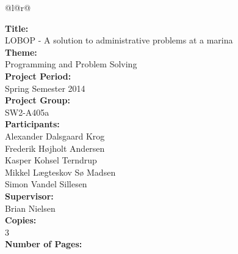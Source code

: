 \pagestyle{titlepagestyleeng}


\begin{nopagebreak}
{\begin{center}
    \begin{tabular*}{\textwidth}{@{}l@{\extracolsep{\fill}}r@{}}
        \\
        \begin{minipage}[t]{0.49\textwidth}
            \textbf{Title:}\\
            LOBOP - A solution to administrative problems at a marina\\

            \textbf{Theme:}\\
            Programming and Problem Solving\\

            \textbf{Project Period:}\\
            Spring Semester 2014\\

            \textbf{Project Group:}\\
            SW2-A405a\\

            \textbf{Participants:}\\
            Alexander Dalsgaard Krog\\
            Frederik Højholt Andersen\\
            Kasper Kohsel Terndrup\\
            Mikkel Lægteskov Sø Madsen\\
            Simon Vandel Sillesen\\

            \textbf{Supervisor:}\\
            Brian Nielsen\\

            \textbf{Copies:}\\
            3\\

            \textbf{Number of Pages:}\\
            \numberpages\\ 


\end{minipage}
\end{tabular*}
\end{center}}
\end{nopagebreak}
